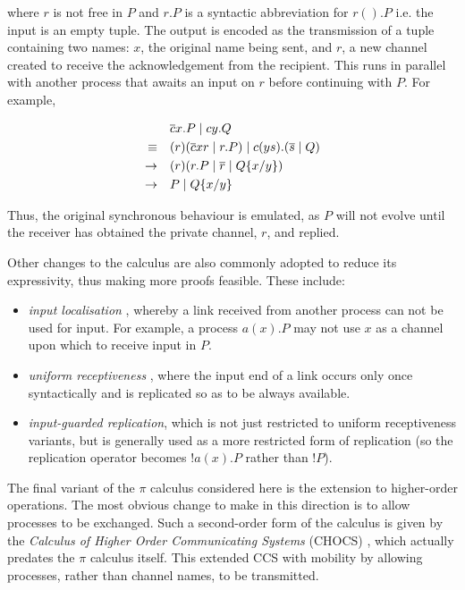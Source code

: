 \noindent where $r$ is not free in $P$ and $r.P$ is a syntactic
abbreviation for $r().P$ i.e. the input is an empty tuple.  The output
is encoded as the transmission of a tuple containing two names: $x$,
the original name being sent, and $r$, a new channel created to
receive the acknowledgement from the recipient.  This runs in parallel
with another process that awaits an input on $r$ before continuing
with $P$.  For example,

\begin{equation}
\begin{aligned}
& \overline{c}x.P \;|\; cy.Q \\
\equiv \quad & (r)(\overline{c}xr\;|\;r.P) \;|\; c(ys).(\overline{s}\;|\;Q) \\
\stackrel{}{\rightarrow} \quad & (r) (r.P \;|\; \overline{r} \;|\; Q\{x/y\}) \\
\stackrel{}{\rightarrow} \quad & P \;|\; Q\{x/y\}
\end{aligned}
\end{equation}

\noindent Thus, the original synchronous behaviour is emulated, as $P$
will not evolve until the receiver has obtained the private channel,
$r$, and replied.

Other changes to the calculus are also commonly adopted to reduce its
expressivity, thus making more proofs feasible.  These include:

\begin{itemize}
\item \emph{input localisation} \cite{merro:locality}, whereby a link
  received from another process can not be used for input.  For
  example, a process $a(x).P$ may not use $x$ as a channel upon which
  to receive input in $P$.
\item \emph{uniform receptiveness}
  \cite{sangiorgi:uniformreceptiveness}, where the input end of a link
  occurs only once syntactically and is replicated so as to be always
  available.
\item \emph{input-guarded replication}, which is not just restricted
  to uniform receptiveness variants, but is generally used as a more
  restricted form of replication (so the replication operator becomes
  $!a(x).P$ rather than $!P$).
\end{itemize}

The final variant of the $\pi$ calculus considered here is the
extension to higher-order operations.  The most obvious change to make
in this direction is to allow processes to be exchanged.  Such a
second-order form of the calculus is given by the \emph{Calculus of
  Higher Order Communicating Systems} (CHOCS) \cite*{thomsen:chocs},
which actually predates the $\pi$ calculus itself.  This extended CCS
with mobility by allowing processes, rather than channel names, to be
transmitted.

